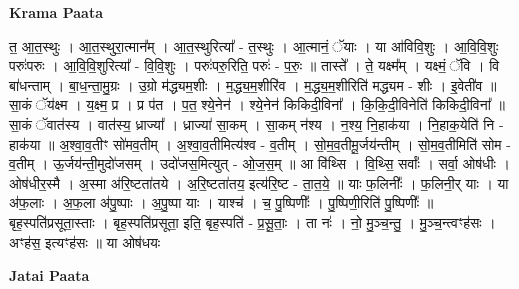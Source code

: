 \documentclass[17pt]{extarticle}
\begin{document}
\textbf{Krama Paata} \newline

त॒ आ॒त॒स्थुः । आ॒त॒स्थुरा॒त्मान᳚म् । आ॒त॒स्थुरित्या᳚ - त॒स्थुः । आ॒त्मानं॒ ॅयाः । या आ॑विवि॒शुः । आ॒वि॒वि॒शुः परुः॑परुः । आ॒वि॒वि॒शुरित्या᳚ - वि॒वि॒शुः । परुः॑परु॒रिति॒ परुः॑ - प॒रुः॒ ॥ तास्ते᳚ । ते॒ यक्ष्म᳚म् । यक्ष्मं॒ ॅवि । वि बा॑धन्ताम् । बा॒ध॒न्ता॒मु॒ग्रः । उ॒ग्रो म॑द्ध्यम॒शीः । म॒द्ध्य॒म॒शीरि॑व । म॒द्ध्य॒म॒शीरिति॑ मद्ध्यम - शीः । इ॒वेती॑व ॥ सा॒कं ॅय॑क्ष्म । य॒क्ष्म॒ प्र । प्र प॑त । प॒त॒ श्ये॒नेन॑ । श्ये॒नेन॑ किकिदी॒विना᳚ । कि॒कि॒दी॒विनेति॑ किकिदी॒विना᳚ ॥ सा॒कं ॅवात॑स्य । वात॑स्य॒ ध्राज्या᳚ । ध्राज्या॑ सा॒कम् । सा॒कम् न॑श्य । न॒श्य॒ नि॒हाक॑या । नि॒हाक॒येति॑ नि - हाक॑या ॥ अ॒श्वा॒व॒तीꣳ सो॑मव॒तीम् । अ॒श्वा॒व॒तीमित्य॑श्व - व॒तीम् । सो॒म॒व॒तीमू॒र्जय॑न्तीम् । सो॒म॒व॒तीमिति॑ सोम - व॒तीम् । ऊ॒र्जय॑न्ती॒मुदो॑जसम् । उदो॑जस॒मित्युत् - ओ॒ज॒स॒म् ॥ आ वि॑थ्सि । वि॒थ्सि॒ सर्वाः᳚ । सर्वा॒ ओष॑धीः । ओष॑धीर॒स्मै । अ॒स्मा अ॑रि॒ष्टता॑तये । अ॒रि॒ष्टता॑तय॒ इत्य॑रि॒ष्ट - ता॒त॒ये॒ ॥ याः फ॒लिनीः᳚ । फ॒लिनी॒र् याः । या अ॑फ॒लाः । अ॒फ॒ला अ॑पु॒ष्पाः । अ॒पु॒ष्पा याः । याश्च॑ । च॒ पु॒ष्पिणीः᳚ । पु॒ष्पिणी॒रिति॑ पु॒ष्पिणीः᳚ ॥ बृह॒स्पति॑प्रसूता॒स्ताः । बृह॒स्पति॑प्रसूता॒ इति॒ बृह॒स्पति॑ - प्र॒सू॒ताः॒ । ता नः॑ । नो॒ मु॒ञ्च॒न्तु॒ । मु॒ञ्च॒न्त्वꣳह॑सः । अꣳह॑स॒ इत्यꣳह॑सः ॥ या ओष॑धयः \newline

\textbf{Jatai Paata} \newline
\end{document}
